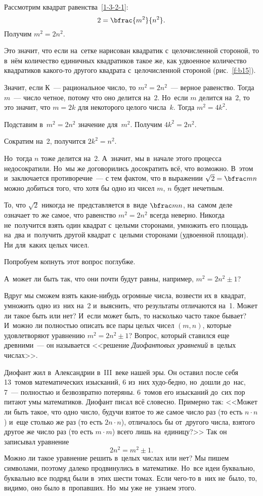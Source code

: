 Рассмотрим квадрат равенства~\eqref{1-3-2-1}:
$$
2=\bfrac{m^{2}}{n^{2}}.
$$
Получим $m^{2}=2n^{2}$.

Это значит, что если на~сетке нарисован квадратик с~целочисленной стороной, то в~нём количество
единичных квадратиков такое же, как удвоенное количество квадратиков какого-то другого квадрата
с~целочисленной стороной (рис.~\ref{f:b15}).



Значит, если $\text{К}$~--- рациональное число, то $m^{2}=2n^{2}$~--- верное равенство. Тогда $m$~--- число четное,
потому что оно делится на~2. Но~если $m$ делится на~2, то это значит, что $m=2k$ для некоторого целого числа~$k$. Тогда $m^{2}=4k^{2}$.

Подставим в~$m^{2}=2n^{2}$ значение для~$m^{2}$. Получим $4k^{2}=2n^{2}$.

Сократим на~2, получится $2k^{2}=n^{2}$.

Но~тогда $n$ тоже делится на~2. А~значит, мы в~начале этого процесса недосократили. Но~мы же
договорились досократить всё, что возможно. В~этом и~заключается противоречие~--- с тем фактом, что в
выражении $\sqrt{2}=\bfrac mn$ можно добиться того, что хотя бы одно из чисел $m$, $n$ будет нечетным.

То, что $\sqrt2$ никогда не~представляется в~виде $\bfrac mn$, на~самом деле означает то же самое,
что равенство $m^{2}=2n^{2}$ всегда неверно. Никогда не~получится взять один квадрат с~целыми сторонами,
умножить его площадь на~два и~получить другой квадрат с~целыми сторонами (удвоенной площади). Ни
для~каких целых чисел.

Попробуем копнуть этот вопрос поглубже.

А~может ли быть так, что они почти будут равны, например, $m^{2} =2n^{2}\pm1$?

Вдруг мы сможем взять какие-нибудь огромные числа, возвести их в~квадрат, умножить одно из~них
на~2 и~выяснить, что результаты отличаются на~1. Может ли такое быть или нет? И~если может быть,
то насколько часто такое бывает? И~можно ли полностью описать все пары целых чисел $(m,n)$, которые
удовлетворяют уравнению $m^{2} = 2n^{2}\pm 1$?
 Вопрос, который ставился еще древними~--- он называется
<<решение \textit{Диофантовых уравнений} в~целых числах>>.

Диофант жил в~Александрии в~III~веке нашей эры. Он оставил после себя 13~томов математических
изысканий, 6 из~них худо-бедно, но~дошли до~нас, 7~--- полностью и безвозвратно потеряны.
 6~томов его
изысканий до~сих пор питают умы математиков. Диофант писал всё словесно. Примерно так: <<Может ли
быть такое, что одно число, будучи взятое то же самое число раз (то есть $n\cdot n$) и~еще столько же раз
(то есть $2n\cdot n$), отличалось бы от~другого числа, взятого другое же число раз (то есть $m\cdot m$) всего лишь
на~единицу?>> Так он записывал уравнение
$$
2n^{2} = m^{2} \pm 1.
$$
Можно ли такое уравнение решить в~целых числах или нет? Мы пишем символами, поэтому далеко
продвинулись в~математике. Но~все идеи буквально, буквально все подряд были в~этих шести томах.
Если чего-то в~них не~было, то, видимо, оно было в~пропавших. Но~мы уже не~узнаем этого.

